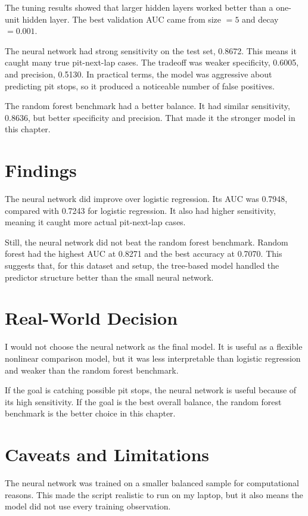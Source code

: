 \documentclass[11pt,oneside,openany]{book}
\begin{document}
The tuning results showed that larger hidden layers worked better than a one-unit hidden layer. The best validation AUC came from size \(=5\) and decay \(=0.001\).

The neural network had strong sensitivity on the test set, 0.8672. This means it caught many true pit-next-lap cases. The tradeoff was weaker specificity, 0.6005, and precision, 0.5130. In practical terms, the model was aggressive about predicting pit stops, so it produced a noticeable number of false positives.

The random forest benchmark had a better balance. It had similar sensitivity, 0.8636, but better specificity and precision. That made it the stronger model in this chapter.

\section{Findings}

The neural network did improve over logistic regression. Its AUC was 0.7948, compared with 0.7243 for logistic regression. It also had higher sensitivity, meaning it caught more actual pit-next-lap cases.

Still, the neural network did not beat the random forest benchmark. Random forest had the highest AUC at 0.8271 and the best accuracy at 0.7070. This suggests that, for this dataset and setup, the tree-based model handled the predictor structure better than the small neural network.

\section{Real-World Decision}

I would not choose the neural network as the final model. It is useful as a flexible nonlinear comparison model, but it was less interpretable than logistic regression and weaker than the random forest benchmark.

If the goal is catching possible pit stops, the neural network is useful because of its high sensitivity. If the goal is the best overall balance, the random forest benchmark is the better choice in this chapter.

\section{Caveats and Limitations}

The neural network was trained on a smaller balanced sample for computational reasons. This made the script realistic to run on my laptop, but it also means the model did not use every training observation.
\end{document}
